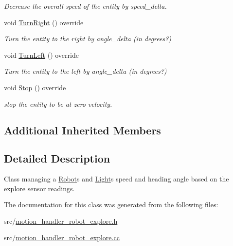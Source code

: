 \begin{DoxyCompactItemize}
\begin{DoxyCompactList}\small\item\em Decrease the overall speed of the entity by speed\+\_\+delta. \end{DoxyCompactList}\item 
void \hyperlink{class_motion_handler_robot_explore_a2641f1d587f28f454f0455f6ccc98c3f}{Turn\+Right} () override\hypertarget{class_motion_handler_robot_explore_a2641f1d587f28f454f0455f6ccc98c3f}{}\label{class_motion_handler_robot_explore_a2641f1d587f28f454f0455f6ccc98c3f}

\begin{DoxyCompactList}\small\item\em Turn the entity to the right by angle\+\_\+delta (in degrees?) \end{DoxyCompactList}\item 
void \hyperlink{class_motion_handler_robot_explore_a4abe8735e4f4d22757a544d075885402}{Turn\+Left} () override\hypertarget{class_motion_handler_robot_explore_a4abe8735e4f4d22757a544d075885402}{}\label{class_motion_handler_robot_explore_a4abe8735e4f4d22757a544d075885402}

\begin{DoxyCompactList}\small\item\em Turn the entity to the left by angle\+\_\+delta (in degrees?) \end{DoxyCompactList}\item 
void \hyperlink{class_motion_handler_robot_explore_a975326a8f0719b6feb48a7aa24afe4ea}{Stop} () override\hypertarget{class_motion_handler_robot_explore_a975326a8f0719b6feb48a7aa24afe4ea}{}\label{class_motion_handler_robot_explore_a975326a8f0719b6feb48a7aa24afe4ea}

\begin{DoxyCompactList}\small\item\em stop the entity to be at zero velocity. \end{DoxyCompactList}\end{DoxyCompactItemize}
\subsection*{Additional Inherited Members}


\subsection{Detailed Description}
Class managing a \hyperlink{class_robot}{Robot}\textquotesingle{}s and \hyperlink{class_light}{Light}\textquotesingle{}s speed and heading angle based on the explore sensor readings. 

The documentation for this class was generated from the following files\+:\begin{DoxyCompactItemize}
\item 
src/\hyperlink{motion__handler__robot__explore_8h}{motion\+\_\+handler\+\_\+robot\+\_\+explore.\+h}\item 
src/\hyperlink{motion__handler__robot__explore_8cc}{motion\+\_\+handler\+\_\+robot\+\_\+explore.\+cc}\end{DoxyCompactItemize}
